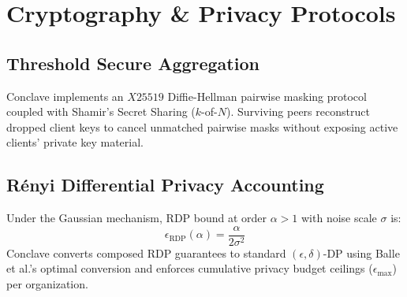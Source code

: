 \section{Cryptography \& Privacy Protocols}
\label{sec:cryptography_privacy}

\subsection{Threshold Secure Aggregation}
Conclave implements an $X25519$ Diffie-Hellman pairwise masking protocol coupled with Shamir's Secret Sharing ($k$-of-$N$). Surviving peers reconstruct dropped client keys to cancel unmatched pairwise masks without exposing active clients' private key material.

\subsection{Rényi Differential Privacy Accounting}
Under the Gaussian mechanism, RDP bound at order $\alpha > 1$ with noise scale $\sigma$ is:
\begin{equation}
    \epsilon_{\text{RDP}}(\alpha) = \frac{\alpha}{2\sigma^2}
\end{equation}
Conclave converts composed RDP guarantees to standard $(\epsilon, \delta)$-DP using Balle et al.'s optimal conversion and enforces cumulative privacy budget ceilings ($\epsilon_{\text{max}}$) per organization.
